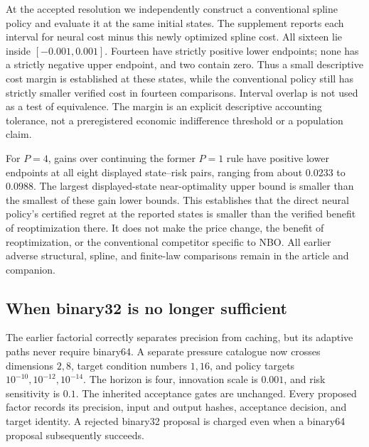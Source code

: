 \documentclass[ecta,nameyear,draft]{econsocart}
\theoremstyle{definition}
\theoremstyle{remark}
\begin{document}
At the accepted resolution we independently construct a conventional
spline policy and evaluate it at the same initial states. The supplement
reports each interval for neural cost minus this newly optimized spline
cost. All sixteen lie inside $[-0.001,0.001]$. Fourteen have strictly positive
lower endpoints; none has a strictly negative upper endpoint, and two
contain zero. Thus a small descriptive cost margin is established at these
states, while the conventional policy still has strictly smaller verified
cost in fourteen comparisons. Interval overlap is not used as a test of
equivalence. The margin is an explicit descriptive accounting tolerance,
not a preregistered economic indifference threshold or a population claim.

For $P=4$, gains over continuing the former $P=1$ rule have positive lower
endpoints at all eight displayed state--risk pairs, ranging from about
$0.0233$ to $0.0988$. The largest displayed-state near-optimality upper
bound is smaller than the smallest of these gain lower bounds. This
establishes that the direct neural policy's certified regret at the reported
states is smaller than the verified benefit of reoptimization there. It
does not make the price change, the benefit of reoptimization, or the
conventional competitor specific to NBO. All earlier adverse structural,
spline, and finite-law comparisons remain in the article and companion.

\subsection{When binary32 is no longer sufficient}
The earlier factorial correctly separates precision from caching, but its
adaptive paths never require binary64. A separate pressure catalogue now
crosses dimensions $2,8$, target condition numbers $1,16$, and policy targets
$10^{-10},10^{-12},10^{-14}$. The horizon is four, innovation scale is
$0.001$, and risk sensitivity is $0.1$. The inherited acceptance gates are
unchanged. Every proposed factor records its precision, input and output
hashes, acceptance decision, and target identity. A rejected binary32
proposal is charged even when a binary64 proposal subsequently succeeds.
\end{document}
